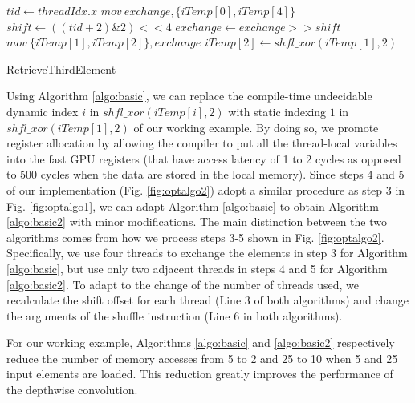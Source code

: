 \begin{algorithm}[t!]
\small

	$tid \gets threadIdx.x$\;
	$mov\ exchange, \{iTemp[0], iTemp[4]\}$\;
	$shift \gets ((tid+2)\&2)<<4$\;
	$exchange \gets exchange >> shift$\;
	$mov\ \{iTemp[1],iTemp[2]\}, exchange$\;
	$iTemp[2] \gets shfl\_xor(iTemp[1],2)$\;	
	
	\caption{RetrieveThirdElement}
	\label{algo:basic}
	
\end{algorithm}

Using Algorithm \ref{algo:basic}, we can replace the compile-time undecidable dynamic index $i$ in $shfl\_xor(iTemp[i],2)$ with static
indexing $1$ in $shfl\_xor(iTemp[1],2)$ of our working example. By doing so, we promote register allocation by allowing the compiler to put
all the thread-local variables into the fast GPU registers (that have access latency of 1 to 2 cycles as opposed to 500 cycles when the
data are stored in the local memory). Since steps 4 and 5 of our implementation (Fig. \ref{fig:optalgo2}) adopt a similar procedure as
step 3 in Fig. \ref{fig:optalgo1}, we can adapt Algorithm \ref{algo:basic} to obtain Algorithm \ref{algo:basic2} with minor
modifications. The main distinction between the two algorithms comes from how we process steps 3-5 shown in Fig. \ref{fig:optalgo2}.
Specifically, we use four threads to exchange the elements in step 3 for Algorithm \ref{algo:basic}, but use only two adjacent threads in
steps 4 and 5 for Algorithm \ref{algo:basic2}. To adapt to the change of the number of threads used, we recalculate the shift offset for
each thread (Line 3 of both algorithms) and change the arguments of the shuffle instruction (Line 6 in both algorithms).

For our working example, Algorithms \ref{algo:basic} and \ref{algo:basic2} respectively reduce the number of memory accesses from 5 to 2
and 25 to 10 when 5 and 25 input elements are loaded. This reduction greatly improves the performance of the depthwise convolution.

